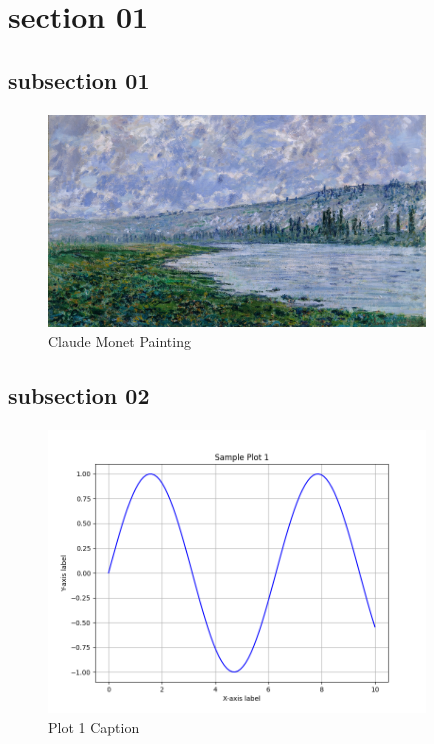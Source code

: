 \documentclass[class=book, crop=false]{standalone}
\begin{document}
\section{section 01}

\subsection{subsection 01}

\paragraph*{}
\blindtext

\paragraph*{}
\blindtext

\begin{figure}[htbp]
    \centering
    \includegraphics[width=10cm]{../../../figures_and_plots/figures/claude_monet_painting.jpg}
    \caption{Claude Monet Painting}
    \label{fig:claude_monet_painting}
\end{figure}

\subsection{subsection 02}

\paragraph*{}
\Blindtext

\begin{figure}[htbp]
    \centering
    \includegraphics[width=10cm]{../../../figures_and_plots/plots/plot1.png}
    \caption{Plot 1 Caption}
    \label{fig:plot1}
\end{figure}
\end{document}
